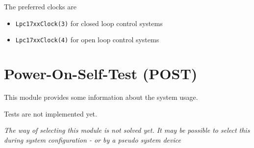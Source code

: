 The preferred clocks are 
\begin{itemize}
\item \texttt{Lpc17xxClock(3)} for closed loop control systems
\item \texttt{Lpc17xxClock(4)} for open loop control systems
\end{itemize} 


\section{Power-On-Self-Test (POST)}
This module provides some information about the system usage.

Tests are not implemented yet.

\em{The way of selecting this module is not solved yet. It may be possible to 
select this during system configuration - or by a pseudo system device}


